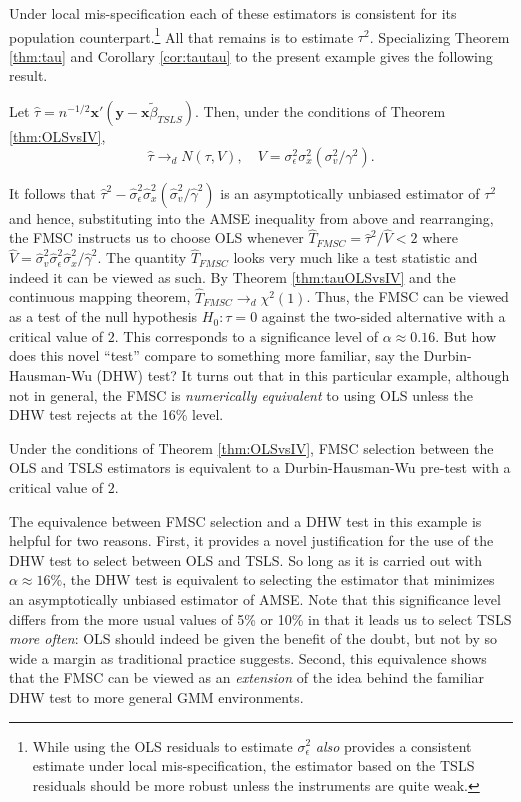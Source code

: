 Under local mis-specification each of these estimators is consistent for its population counterpart.\footnote{While using the OLS residuals to estimate $\sigma_\epsilon^2$ \emph{also} provides a consistent estimate under local mis-specification, the estimator based on the TSLS residuals should be more robust unless the instruments are quite weak.}
All that remains is to estimate $\tau^2$. Specializing Theorem \ref{thm:tau} and Corollary \ref{cor:tautau} to the present example gives the following result.
\begin{thm}
	\label{thm:tauOLSvsIV}
	Let $\widehat{\tau} =  n^{-1/2} \mathbf{x}'(\mathbf{y} - \mathbf{x}\widetilde{\beta}_{TSLS})$. Then, under the conditions of Theorem \ref{thm:OLSvsIV},
	$$\widehat{\tau}\rightarrow_d N(\tau,V), \quad V = \sigma_\epsilon^2 \sigma_x^2(\sigma_v^2/\gamma^2).$$ 
\end{thm}
It follows that $\widehat{\tau}^2 -  \widehat{\sigma}_\epsilon^2\widehat{\sigma}_x^2 \left(\widehat{\sigma}_v^2/\widehat{\gamma}^2\right)$ is an asymptotically unbiased estimator of $\tau^2$ and hence, substituting into the AMSE inequality from above and rearranging, the FMSC instructs us to choose OLS whenever $\widehat{T}_{FMSC} = \widehat{\tau}^2/\widehat{V} < 2$
where $\widehat{V} = \widehat{\sigma}_v^2 \widehat{\sigma}_\epsilon^2 \widehat{\sigma}_x^2/\widehat{\gamma}^2$. 
The quantity $\widehat{T}_{FMSC}$ looks very much like a test statistic and indeed it can be viewed as such. 
By Theorem \ref{thm:tauOLSvsIV} and the continuous mapping theorem, $\widehat{T}_{FMSC} \rightarrow_d \chi^2(1)$. 
Thus, the FMSC can be viewed as a test of the null hypothesis $H_0\colon \tau = 0$ against the two-sided alternative with a critical value of $2$. 
This corresponds to a significance level of $\alpha \approx 0.16$. 
But how does this novel ``test'' compare to something more familiar, say the Durbin-Hausman-Wu (DHW) test? 
It turns out that in this particular example, although not in general, the FMSC is \emph{numerically equivalent} to using OLS unless the DHW test rejects at the 16\% level. 
\begin{thm}
    \label{thm:DHW} Under the conditions of Theorem \ref{thm:OLSvsIV}, FMSC selection between the OLS and TSLS estimators is equivalent to a Durbin-Hausman-Wu pre-test with a critical value of $2$.
\end{thm}
The equivalence between FMSC selection and a DHW test in this example is helpful for two reasons. 
First, it provides a novel justification for the use of the DHW test to select between OLS and TSLS. So long as it is carried out with $\alpha \approx 16\%$, the DHW test is equivalent to selecting the estimator that minimizes an asymptotically unbiased estimator of AMSE. 
Note that this significance level differs from the more usual values of 5\% or 10\% in that it leads us to select TSLS \emph{more often}: OLS should indeed be given the benefit of the doubt, but not by so wide a margin as traditional practice suggests. 
Second, this equivalence shows that the FMSC can be viewed as an \emph{extension} of the idea behind the familiar DHW test to more general GMM environments. 